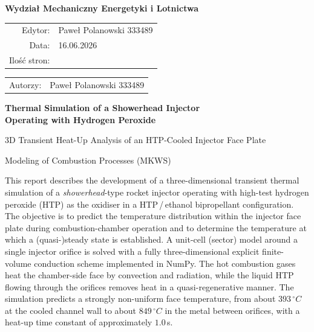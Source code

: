 \documentclass[11pt,a4paper]{article}
\newcommand{\degC}{\ensuremath{^{\circ}}C}
\newcommand{\DocTitleA}{Thermal Simulation of a Showerhead Injector}
\newcommand{\DocTitleB}{Operating with Hydrogen Peroxide}
\newcommand{\DocSubtitle}{3D Transient Heat-Up Analysis of an HTP-Cooled Injector Face Plate}
\newcommand{\DocAuthor}{Pawe\l{} Polanowski 333489}
\newcommand{\DocDate}{16.06.2026}
\newcommand{\facultyname}{Wydzia\l{} Mechaniczny Energetyki i Lotnictwa}
\begin{document}
\thispagestyle{empty}
\begin{center}
  \vspace*{1.5cm}
  {\large\bfseries \facultyname}\\[2.2cm]
\end{center}

\noindent
\begin{minipage}[t]{0.55\textwidth}
  \begin{tabular}{@{}rl@{}}
    Edytor:      & \DocAuthor \\
    Data:        & \DocDate \\
    Ilo\'s\'c stron: & \pageref{LastPage} \\
  \end{tabular}
\end{minipage}%
\begin{minipage}[t]{0.45\textwidth}
  \begin{tabular}{@{}rl@{}}
    Autorzy: & \DocAuthor \\
  \end{tabular}
\end{minipage}

\vspace{2.5cm}
\begin{center}
  {\Huge\bfseries \DocTitleA\\[0.2em] \DocTitleB\par}
  \vspace{1.4cm}
  {\large \DocSubtitle\par}
  \vspace{0.4cm}
  {\large Modeling of Combustion Processes (MKWS)\par}
\end{center}

\vspace{1.2cm}
\begin{center}
\begin{minipage}{0.86\textwidth}
\small
This report describes the development of a three-dimensional transient thermal
simulation of a \emph{showerhead}-type rocket injector operating with high-test
hydrogen peroxide (HTP) as the oxidiser in a HTP\,/\,ethanol bipropellant
configuration. The objective is to predict the temperature distribution within
the injector face plate during combustion-chamber operation and to determine the
temperature at which a (quasi-)steady state is established. A unit-cell (sector)
model around a single injector orifice is solved with a fully three-dimensional
explicit finite-volume conduction scheme implemented in NumPy. The hot combustion
gases heat the chamber-side face by convection and radiation, while the liquid
HTP flowing through the orifices removes heat in a quasi-regenerative manner. The
simulation predicts a strongly non-uniform face temperature, from about
$393\,\degC$ at the cooled channel wall to about $849\,\degC$ in the metal between
orifices, with a heat-up time constant of approximately $1.0\,$s.
\end{minipage}
\end{center}
\end{document}
